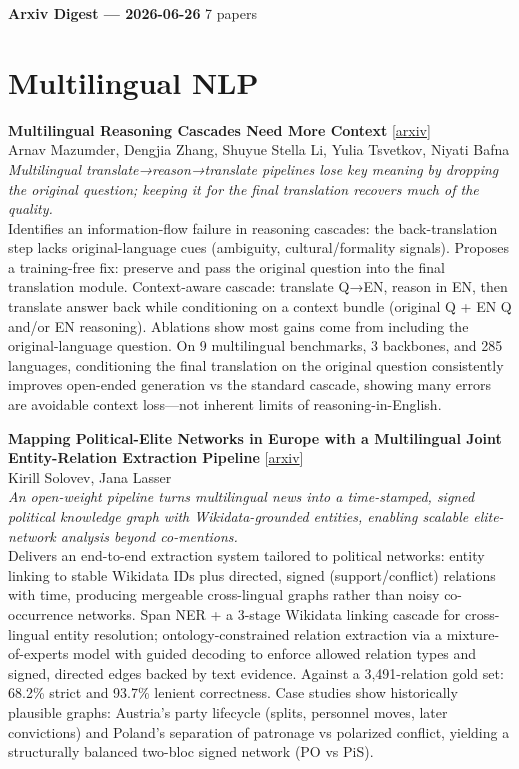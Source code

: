 \documentclass[12pt,letterpaper]{article}
\begin{document}
{\footnotesize\textbf{Arxiv Digest --- 2026-06-26} \hfill 7 papers}

\smallskip

\section*{Multilingual NLP}

{\small\textbf{Multilingual Reasoning Cascades Need More Context}} {\scriptsize[\href{https://arxiv.org/abs/2606.27306}{arxiv}]}\\
{\scriptsize Arnav Mazumder, Dengjia Zhang, Shuyue Stella Li, Yulia Tsvetkov, Niyati Bafna}\\

{\small\textit{Multilingual translate→reason→translate pipelines lose key meaning by dropping the original question; keeping it for the final translation recovers much of the quality.}}\\[1pt]
{\footnotesize Identifies an information-flow failure in reasoning cascades: the back-translation step lacks original-language cues (ambiguity, cultural/formality signals). Proposes a training-free fix: preserve and pass the original question into the final translation module. Context-aware cascade: translate Q→EN, reason in EN, then translate answer back while conditioning on a context bundle (original Q + EN Q and/or EN reasoning). Ablations show most gains come from including the original-language question. On 9 multilingual benchmarks, 3 backbones, and 285 languages, conditioning the final translation on the original question consistently improves open-ended generation vs the standard cascade, showing many errors are avoidable context loss---not inherent limits of reasoning-in-English.}

\medskip

{\small\textbf{Mapping Political-Elite Networks in Europe with a Multilingual Joint Entity-Relation Extraction Pipeline}} {\scriptsize[\href{https://arxiv.org/abs/2606.27347}{arxiv}]}\\
{\scriptsize Kirill Solovev, Jana Lasser}\\

{\small\textit{An open-weight pipeline turns multilingual news into a time-stamped, signed political knowledge graph with Wikidata-grounded entities, enabling scalable elite-network analysis beyond co-mentions.}}\\[1pt]
{\footnotesize Delivers an end-to-end extraction system tailored to political networks: entity linking to stable Wikidata IDs plus directed, signed (support/conflict) relations with time, producing mergeable cross-lingual graphs rather than noisy co-occurrence networks. Span NER + a 3-stage Wikidata linking cascade for cross-lingual entity resolution; ontology-constrained relation extraction via a mixture-of-experts model with guided decoding to enforce allowed relation types and signed, directed edges backed by text evidence. Against a 3,491-relation gold set: 68.2\% strict and 93.7\% lenient correctness. Case studies show historically plausible graphs: Austria's party lifecycle (splits, personnel moves, later convictions) and Poland's separation of patronage vs polarized conflict, yielding a structurally balanced two-bloc signed network (PO vs PiS).}
\end{document}
